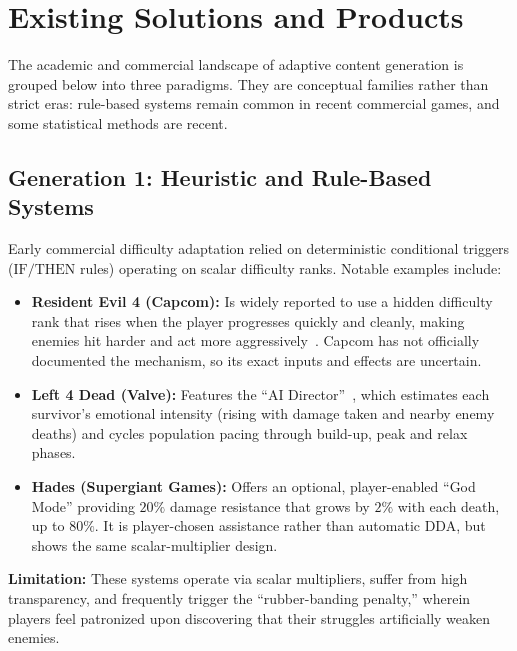 \section{Existing Solutions and Products}
The academic and commercial landscape of adaptive content generation is grouped below into three paradigms. They are conceptual families rather than strict eras: rule-based systems remain common in recent commercial games, and some statistical methods are recent.

\subsection{Generation 1: Heuristic and Rule-Based Systems}
Early commercial difficulty adaptation relied on deterministic conditional triggers ($\text{IF}/\text{THEN}$ rules) operating on scalar difficulty ranks. Notable examples include:
\begin{itemize}
    \item \textbf{Resident Evil 4 (Capcom):} Is widely reported to use a hidden difficulty rank that rises when the player progresses quickly and cleanly, making enemies hit harder and act more aggressively~\cite{engadget2015re4}. Capcom has not officially documented the mechanism, so its exact inputs and effects are uncertain.
    \item \textbf{Left 4 Dead (Valve):} Features the ``AI Director''~\cite{booth2009l4d}, which estimates each survivor's emotional intensity (rising with damage taken and nearby enemy deaths) and cycles population pacing through build-up, peak and relax phases.
    \item \textbf{Hades (Supergiant Games):} Offers an optional, player-enabled ``God Mode'' providing $20\%$ damage resistance that grows by $2\%$ with each death, up to $80\%$. It is player-chosen assistance rather than automatic DDA, but shows the same scalar-multiplier design.
\end{itemize}
\textbf{Limitation:} These systems operate via scalar multipliers, suffer from high transparency, and frequently trigger the ``rubber-banding penalty,'' wherein players feel patronized upon discovering that their struggles artificially weaken enemies.

